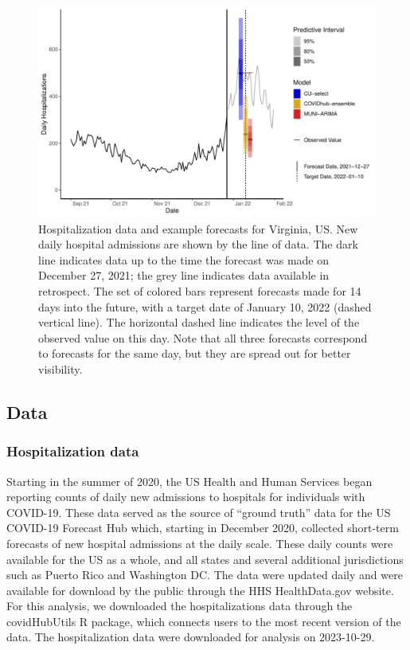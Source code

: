 \documentclass{article}\usepackage[]{graphicx}\usepackage[]{xcolor}
\begin{document}
\begin{figure}
    \includegraphics[width=\textwidth]{../figures/allocation-forecasts-v2.pdf}
    \caption{Hospitalization data and example forecasts for Virginia, US. New daily hospital admissions are shown by the line of data. The dark line indicates data up to the time the forecast was made on December 27, 2021; the grey line indicates data available in retrospect. The set of colored bars represent forecasts made for 14 days into the future, with a target date of January 10, 2022 (dashed vertical line). The horizontal dashed line indicates the level of the observed value on this day. Note that all three forecasts correspond to forecasts for the same day, but they are spread out for better visibility. }
    \label{fig:sample-forecasts}
\end{figure}


\subsection{Data}



\subsubsection{Hospitalization data}
Starting in the summer of 2020, the US Health and Human Services began reporting counts of daily new admissions to hospitals for individuals with COVID-19.\citep{healthdatagov_covid-19_nodate}
These data served as the source of ``ground truth'' data for the US COVID-19 Forecast Hub which, starting in December 2020, collected short-term forecasts of new hospital admissions at the daily scale.
These daily counts were available for the US as a whole, and all states and several additional jurisdictions such as Puerto Rico and Washington DC.
The data were updated daily and were available for download by the public through the HHS HealthData.gov website.
For this analysis, we downloaded the hospitalizations data through the covidHubUtils R package, which connects users to the most recent version of the data.\cite{wang-covidhubutils}
The hospitalization data were downloaded for analysis on 2023-10-29.
\end{document}
